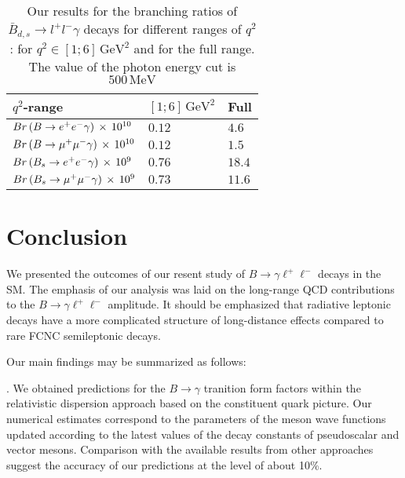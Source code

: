 \documentclass{PoS}
\begin{document}
\begin{table}[H]
\centering
\caption{Our results for the branching ratios of $\bar{B}_{d,s}\to l^+l^-\gamma$ decays for different ranges of $q^2$: 
for $q^2\in[1;6]\,\mathrm{GeV^2}$ and for the full range. The value of the photon energy cut is $500\,\mathrm{MeV}$ }
\label{tab-ratios}
\vspace{.2cm}

\begin{tabular}{l|ll}
\hline
$q^2$-range                    & $[1;6]\,\mathrm{GeV^2}$ & Full \\
\hline
\protect\( Br\left ( B\to e^+e^-\gamma\right )\,\times\, 10^{10}\protect\) &

                           $0.12$    &
                           $4.6$ \\
\protect\( Br\left ( B\to \mu^+\mu^-\gamma\right )\,\times\, 10^{10}\protect\) &
                           $0.12$    &
                           $1.5$ \\
\protect\( Br\left ( B_s\to e^+e^-\gamma\right )\,\times\, 10^{9}\protect\) &
                           $0.76$    &
                           $18.4$ \\
\protect\( Br\left ( B_s\to \mu^+\mu^-\gamma\right )\,\times\, 10^{9}\protect\) &
                           $0.73$     &
                           $11.6$ \\
\hline
\end{tabular}
\end{table}
\section{Conclusion}
We presented the outcomes of our resent study of $B\to\gamma \ell^+\ell^-$ decays in the SM. The emphasis of our analysis was laid on the long-range QCD contributions to the 
$B\to\gamma \ell^+\ell^-$ amplitude. It should be emphasized that radiative leptonic decays have a more complicated structure of long-distance effects compared 
to rare FCNC semileptonic decays. 

Our main findings may be summarized as follows: 

\vspace{.2cm}
. We obtained predictions for the $B\to \gamma$ tranition form factors within the relativistic dispersion approach based on the constituent quark picture.
Our numerical estimates correspond to the parameters of the meson wave functions updated according to the latest values of the decay constants of 
pseudoscalar and vector mesons. Comparison with the available results from other approaches suggest the accuracy of our predictions 
at the level of about 10\%.  
\end{document}
